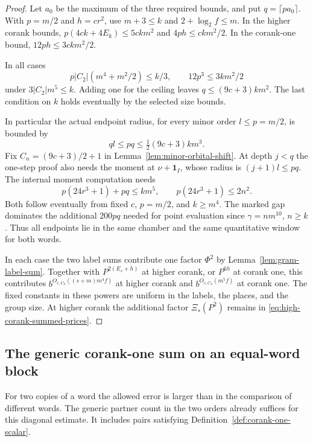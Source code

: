 \begin{proof}
Let \(a_0\) be the maximum of the three required bounds,
and put \(q=\lceil p a_0\rceil\). With \(p=m/2\) and \(h=cr^2\),
use \(m+3\le k\) and \(2+\log_2 f\le m\). In the higher
corank bounds, \(p(4ck+4E_k)\le 5ckm^2\) and
\(4ph\le ckm^2/2\). In the corank-one bound,
\(12ph\le 3ckm^2/2\).

In all cases
\[
 p|C_2|(m^4+m^2/2)\le k/3,\qquad 12p^3\le 3km^2/2
\]
under \(3|C_2|m^5\le k\). Adding one for the ceiling leaves
\(q\le(9c+3)km^2\). The last condition on \(k\) holds
eventually by the selected size bounds.

In particular the actual endpoint radius, for every minor order
\(l\le p=m/2\), is bounded by
\[
  ql\le pq\le \tfrac12(9c+3)km^3 .
\]
Fix \(C_n=(9c+3)/2+1\) in Lemma~\ref{lem:minor-orbital-shift}.
At depth \(j<q\) the one-step proof also needs the moment at
\(\nu+\mathbf1_I\), whose radius is \((j+1)l\le pq\).
The internal moment computation needs
\[
      p(24r^3+1)+pq\le km^5,\qquad p(24r^3+1)\le2n^2 .
\]
Both follow eventually from fixed \(c\), \(p=m/2\), and \(k\ge m^4\).
The marked gap dominates the additional \(200pq\) needed for
point evaluation since \(\gamma=nm^{10}\), \(n\ge k\).
Thus all endpoints lie in the same chamber and the same quantitative
window for both words.

In each case the two label sums contribute one factor \(\Phi^2\)
by Lemma~\ref{lem:gram-label-sum}. Together with
\(P^{2(E_s+h)}\) at higher corank, or \(P^{6h}\) at corank one,
this contributes
\(b^{O_{c,C_h}((s+m)m^4f)}\) at higher corank
and \(b^{O_{c,C_h}(m^5f)}\) at corank one. The fixed
constants in these powers are uniform in the labels,
the places, and the group size. At higher corank the additional
factor \(\Xi_s(P^2)\) remains in \eqref{eq:high-corank-summed-prices}.
\end{proof}

\subsection{The generic corank-one sum on an equal-word block}

For two copies of a word the allowed error is larger than in the
comparison of different words. The generic partner count in the two
orders already suffices for this diagonal estimate. It includes
pairs satisfying Definition~\ref{def:corank-one-scalar}.

